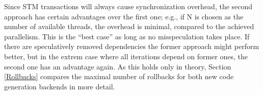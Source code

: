 Since STM transactions will always cause synchronization overhead,
the second approach has certain advantages over the first one; e.g., 
if N is chosen as the number of available threads, the overhead is minimal, 
compared to the achieved parallelism. This is the ``best case'' as long as no
misspeculation takes place. If there are speculatively removed dependencies
the former approach might perform better, but in the extrem case where all iterations
depend on former ones, the second one has an advantage again. As this holds only
in theory, Section \ref{Rollbacks} compares the maximal number of rollbacks 
for both new code generation backends in more detail. 






